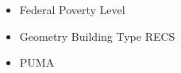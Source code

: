 \begin{itemize}
\item Federal Poverty Level
\item Geometry Building Type RECS
\item PUMA
\end{itemize}
